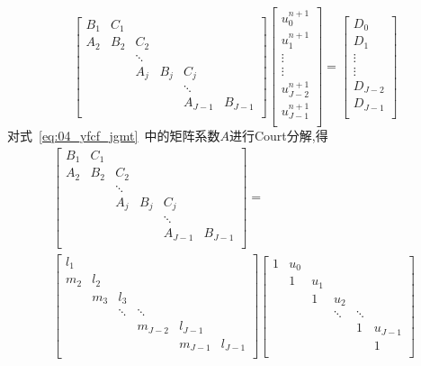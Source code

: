 \begin{equation}~\label{eq:04_yfcf_jgmt}
\begin{bmatrix}
   B_1 & C_1 \\
   A_2 & B_2 & C_2 \\
       &  & \ddots    &  \\
       &     & A_j &  B_j    & C_j          \\
       &     &        &  & \ddots     \\
       &     &        &        &   A_{J-1}   & B_{J-1}     \\
\end{bmatrix}
\begin{bmatrix}
u_0^{n+1} \\
u_1^{n+1} \\
\vdots    \\
\vdots    \\
u_{J-2}^{n+1} \\
u_{J-1}^{n+1} \\
\end{bmatrix}
=
\begin{bmatrix}
D_0 \\
D_1\\
\vdots    \\
\vdots    \\
D_{J-2} \\
D_{J-1} \\
\end{bmatrix}
\end{equation}
对式~\ref{eq:04_yfcf_jgmt}~中的矩阵系数$A$进行Court分解,得
\begin{multline}
\begin{bmatrix}
   B_1 & C_1 \\
   A_2 & B_2 & C_2 \\
       &  & \ddots    &  \\
       &     & A_j &  B_j    & C_j          \\
       &     &        &  & \ddots     \\
       &     &        &        &   A_{J-1}   & B_{J-1}     \\
\end{bmatrix}=\\
\begin{bmatrix}
l_1 & \\
m_2 & l_2 \\
    & m_3 & l_3 \\
    &     & \ddots & \ddots & \\
    &     &        & m_{J-2} & l_{J-1} \\
    &	  &	   &	     &  m_{J-1} & l_{J-1} \\
\end{bmatrix}
\begin{bmatrix}
1 & u_0       \\
  &  1  & u_1 \\
  &     &   1  &  u_2 \\
  &     &      &   \ddots & \ddots \\
  &     &      &          &    1   & u_{J-1} \\
  &     &      &          &        &      1   \\
\end{bmatrix}
\end{multline}
